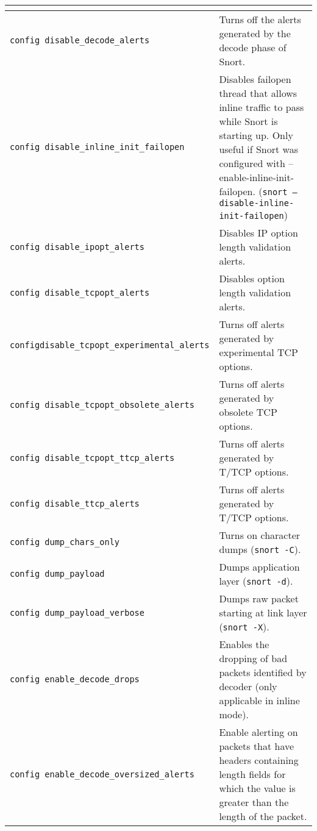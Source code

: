 \documentclass[english]{report}
\begin{document}
\begin{center}
\begin{longtable}[t]{| p{2.5in} | p{3.5in} |}
\begin{itemize}
\end{itemize}\\

\hline
\texttt{config disable\_decode\_alerts} & Turns off the alerts generated by the
decode phase of Snort. \\

\hline
\texttt{config disable\_inline\_init\_failopen} & Disables failopen thread that
allows inline traffic to pass while Snort is starting up.  Only useful if Snort
was configured with --enable-inline-init-failopen.  (\texttt{snort
--disable-inline-init-failopen}) \\

\hline
\texttt{config disable\_ipopt\_alerts} & Disables IP option length validation
alerts. \\

\hline
\texttt{config disable\_tcpopt\_alerts} & Disables option length validation
alerts. \\

\hline
\texttt{config\newline disable\_tcpopt\_experimental\_alerts} & Turns off
alerts generated by experimental TCP options. \\

\hline
\texttt{config disable\_tcpopt\_obsolete\_alerts} & Turns off alerts
generated by obsolete TCP options. \\

\hline
\texttt{config disable\_tcpopt\_ttcp\_alerts} & Turns off alerts generated by
T/TCP options. \\

\hline
\texttt{config disable\_ttcp\_alerts} & Turns off alerts generated by T/TCP
options. \\

\hline
\texttt{config dump\_chars\_only} & Turns on character dumps (\texttt{snort
-C}). \\

\hline
\texttt{config dump\_payload} & Dumps application layer (\texttt{snort -d}). \\

\hline
\texttt{config dump\_payload\_verbose} & Dumps raw packet starting at link
layer (\texttt{snort -X}). \\

\hline
\texttt{config enable\_decode\_drops} & Enables the dropping of bad packets
identified by decoder (only applicable in inline mode).\\

\hline
\texttt{config enable\_decode\_oversized\_alerts} & Enable alerting
on packets that have headers containing length fields for which the value is
greater than the length of the packet. \\


\end{longtable}
\end{center}
\end{document}
